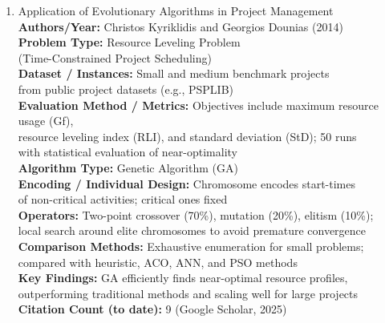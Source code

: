 \documentclass[a4paper,12pt]{article}
\begin{document}
\begin{enumerate}[leftmargin=2em, labelwidth=1em, labelsep=0.5em, itemsep=1ex]
  \item Application of Evolutionary Algorithms in Project Management \\
    \textbf{Authors/Year:} Christos Kyriklidis and Georgios Dounias (2014) \\  
    \textbf{Problem Type:} Resource Leveling Problem\\
    (Time-Constrained Project Scheduling) \\  
    \textbf{Dataset / Instances:} Small and medium benchmark projects\\
    from public project datasets (e.g., PSPLIB) \\  
    \textbf{Evaluation Method / Metrics:} Objectives include maximum resource usage (Gf),\\
    resource leveling index (RLI), and standard deviation (StD); 50 runs\\
    with statistical evaluation of near-optimality \\  
    \textbf{Algorithm Type:} Genetic Algorithm (GA) \\  
    \textbf{Encoding / Individual Design:} Chromosome encodes start-times\\
    of non-critical activities; critical ones fixed \\  
    \textbf{Operators:} Two-point crossover (70\%), mutation (20\%), elitism (10\%);\\
    local search around elite chromosomes to avoid premature convergence \\  
    \textbf{Comparison Methods:} Exhaustive enumeration for small problems;\\
    compared with heuristic, ACO, ANN, and PSO methods \\  
    \textbf{Key Findings:} GA efficiently finds near-optimal resource profiles,\\
    outperforming traditional methods and scaling well for large projects \\  
    \textbf{Citation Count (to date):} 9 (Google Scholar, 2025) \\[2ex]
  

\end{enumerate}
\end{document}
